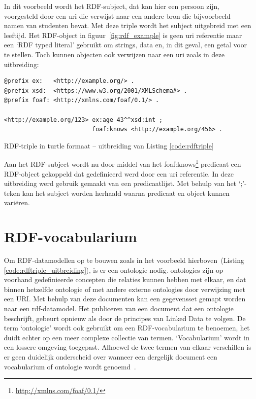 In dit voorbeeld wordt het RDF-subject, dat kan hier een persoon zijn, voorgesteld door een \acrshort{uri} die verwijst naar een andere bron die bijvoorbeeld namen van studenten bevat. Met deze triple wordt het subject uitgebreid met een leeftijd. Het RDF-object in figuur~\ref{fig:rdf_example} is geen \acrshort{uri} referentie maar een `RDF typed literal' gebruikt om strings, data en, in dit geval, een getal voor te stellen. Toch kunnen objecten ook verwijzen naar een \acrshort{uri} zoals in deze uitbreiding:

\begin{code}
\begin{verbatim}
@prefix ex:   <http://example.org/> .
@prefix xsd:  <https://www.w3.org/2001/XMLSchema#> .
@prefix foaf: <http://xmlns.com/foaf/0.1/> .

<http://example.org/123> ex:age 43^^xsd:int ;
                         foaf:knows <http://example.org/456> .
\end{verbatim}
\caption{RDF-triple in turtle formaat -- uitbreiding van Listing \ref{code:rdftriple}}
\label{code:rdftriple_uitbreiding}
\end{code}

Aan het RDF-subject wordt nu door middel van het foaf:knows\footnote{\url{http://xmlns.com/foaf/0.1/}} predicaat een RDF-object gekoppeld dat gedefinieerd werd door een \acrshort{uri} referentie.
In deze uitbreiding werd gebruik gemaakt van een predicaatlijst. Met behulp van het `;'-teken kan het subject worden herhaald waarna predicaat en object kunnen variëren.

\section{RDF-vocabularium}
Om RDF-datamodellen op te bouwen zoals in het voorbeeld hierboven~(Listing \ref{code:rdftriple_uitbreiding}), is er een \gls{ontologie} nodig. \Glspl{ontologie} zijn op voorhand gedefinieerde concepten die relaties kunnen hebben met elkaar, en dat binnen hetzelfde \gls{ontologie} of met andere externe \glspl{ontologie} door verwijzing met een URI. Met behulp van deze documenten kan een gegevensset gemapt worden naar een \acrshort{rdf}-datamodel.
Het publiceren van een document dat een \gls{ontologie} beschrijft, gebeurt opnieuw als door de principes van Linked Data te volgen. De term `ontologie' wordt ook gebruikt om een RDF-vocabularium te benoemen, het duidt echter op een meer complexe collectie van termen. `Vocabularium' wordt in een lossere omgeving toegepast. Alhoewel de twee termen van elkaar verschillen is er geen duidelijk onderscheid over wanneer een dergelijk document een vocabularium of ontologie wordt genoemd~\cite{ontology}.

